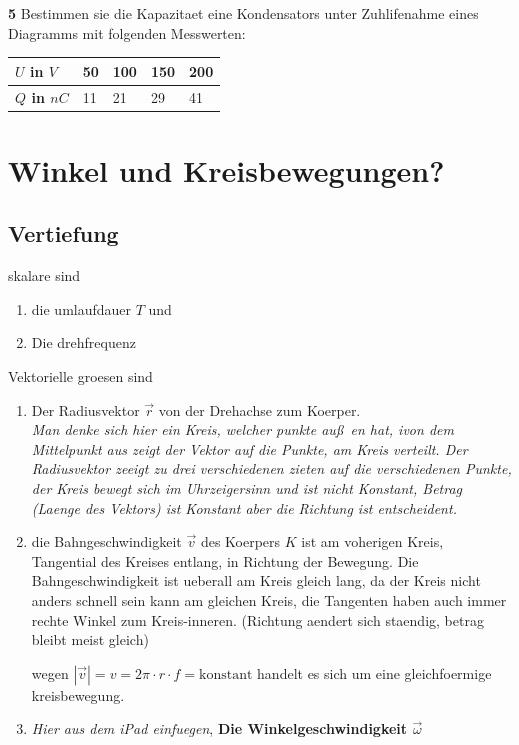 \documentclass{report}
\begin{document}
\textbf{5}
Bestimmen sie die Kapazitaet eine Kondensators unter Zuhlifenahme eines
Diagramms mit folgenden Messwerten:

\begin{table}[htpb]
  \begin{center}
    \begin{tabular}{|l|l|l|l|l|}
      \hline
      \textbf{$U$ in $V$} & 50 & 100 & 150 & 200 \\
      \hline
      \textbf{$Q$ in $nC$}& 11 &  21 &  29 &  41 \\
      \hline
    \end{tabular}
  \end{center}
\end{table}


\section{Winkel und Kreisbewegungen?}
\subsection{Vertiefung}
skalare sind
\begin{enumerate}
  \item die umlaufdauer $T$ und 
  \item Die drehfrequenz
\end{enumerate}

Vektorielle groesen sind
\begin{enumerate}
  \item Der Radiusvektor $\vec{r}$ von der Drehachse zum Koerper.\\
    \textit{Man denke sich hier ein Kreis, welcher punkte au\ss~en hat, ivon
    dem Mittelpunkt aus zeigt der Vektor auf die Punkte, am Kreis verteilt. Der
    Radiusvektor zeeigt zu drei verschiedenen zieten auf die verschiedenen
    Punkte, der Kreis bewegt sich im Uhrzeigersinn und ist nicht Konstant, Betrag
    (Laenge des Vektors) ist Konstant aber die Richtung ist entscheident.}
  \item die Bahngeschwindigkeit $\vec{v}$ des Koerpers $K$ ist am voherigen
    Kreis, Tangential des Kreises entlang, in Richtung der Bewegung.
    Die Bahngeschwindigkeit ist ueberall am Kreis gleich lang, da der Kreis
    nicht anders schnell sein kann am gleichen Kreis, die Tangenten haben auch
    immer rechte Winkel zum Kreis-inneren.
    (Richtung aendert sich staendig, betrag bleibt meist gleich)

    wegen $|\vec{v}|=v=2\pi\cdot r\cdot f= \text{konstant}$  handelt es sich um
    eine gleichfoermige kreisbewegung.
  \item \textit{Hier aus dem iPad einfuegen}, \textbf{Die Winkelgeschwindigkeit $\vec{\omega}$} 
\end{enumerate}
\end{document}
